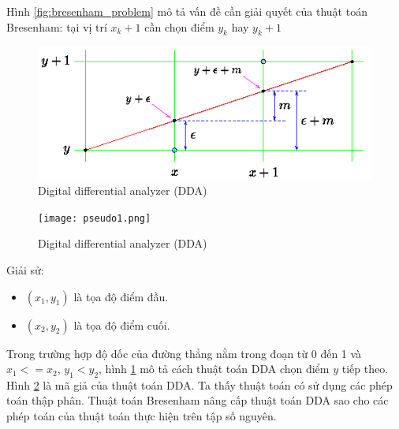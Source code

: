 \documentclass[../../main.tex]{subfiles}
\begin{document}
Hình \ref{fig:bresenham_problem} mô tả vấn đề cần giải quyết của thuật toán Bresenham: tại vị trí $x_k + 1$ cần chọn điểm $y_k$ hay $y_k+1$

\begin{figure}[H]
    \begin{center}
        \includegraphics[scale=0.8]{bres1.png}
    \end{center}
    \caption{Digital differential analyzer (DDA)}
    \label{fig:dda_select}
\end{figure}

\begin{figure}[H]
    \begin{center}
        \texttt{[image: pseudo1.png]}
    \end{center}
    \caption{Digital differential analyzer (DDA)}
    \label{fig:dda_algorithm}
\end{figure}

Giải sử:
\begin{itemize}
    \item $(x_1, y_1)$ là tọa độ điểm đầu.
    \item $(x_2, y_2)$ là tọa độ điểm cuối.
\end{itemize}

Trong trường hợp độ dốc của đường thẳng nằm trong đoạn từ 0 đến 1 và $x_1 <= x_2$, $y_1<y_2$, hình \ref{fig:dda_select} mô tả cách thuật toán DDA chọn điểm $y$ tiếp theo. Hình \ref{fig:dda_algorithm} là mã giả của thuật toán DDA. Ta thấy thuật toán có sử dụng các phép toán thập phân. Thuật toán Bresenham nâng cấp thuật toán DDA sao cho các phép toán của thuật toán thực hiện trên tập số nguyên.
\end{document}
